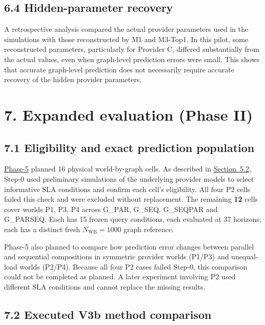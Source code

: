 \documentclass[10pt,a4paper]{article}
\begin{document}
\subsection*{6.4 Hidden-parameter recovery}

A retrospective analysis compared the actual provider parameters used in the simulations with those reconstructed by M1 and M3-Top1. In this pilot, some reconstructed parameters, particularly for Provider C, differed substantially from the actual values, even when graph-level prediction errors were small. This shows that accurate graph-level prediction does not necessarily require accurate recovery of the hidden provider parameters.

\section*{7. Expanded evaluation (Phase II)}

\subsection*{7.1 Eligibility and exact prediction population}

\hyperref[app:experiment-stages]{Phase-5} planned 16 physical world-by-graph cells. As described in \hyperref[sec:experimental-design]{Section~5.2}, Step-0 used preliminary simulations of the underlying provider models to select informative SLA conditions and confirm each cell's eligibility. All four P2 cells failed this check and were excluded without replacement. The remaining \textbf{12} cells cover worlds P1, P3, P4 across G\_PAR, G\_SEQ, G\_SEQPAR and G\_PARSEQ. Each has 15 frozen query conditions, each evaluated at 37 horizons; each has a distinct fresh $N_{\mathrm{WB}}=1000$ graph reference.

Phase-5 also planned to compare how prediction error changes between parallel and sequential compositions in symmetric provider worlds (P1/P3) and unequal-load worlds (P2/P4). Because all four P2 cases failed Step-0, this comparison could not be completed as planned. A later experiment involving P2 used different SLA conditions and cannot replace the missing results.

\subsection*{7.2 Executed V3b method comparison}
\end{document}
